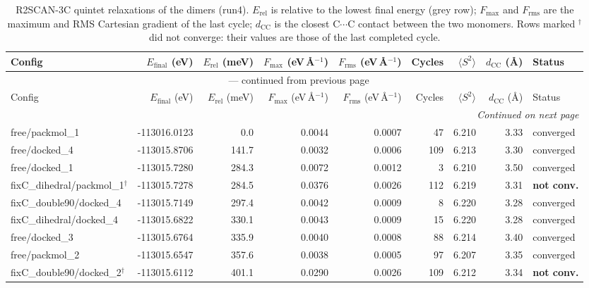 
\begin{longtable}{@{}lrrrrrrrl@{}}
\caption{R2SCAN-3C quintet relaxations of the dimers (run4). $E_{\mathrm{rel}}$ is relative to the
         lowest final energy (grey row); $F_{\mathrm{max}}$ and $F_{\mathrm{rms}}$ are the maximum and RMS
         Cartesian gradient of the last cycle; $d_{\mathrm{CC}}$ is the closest C$\cdots$C contact between the
         two monomers. Rows marked $^{\dagger}$ did not converge: their values are those of the last
         completed cycle.}\label{tab:run4_relaxation}\\
\toprule
Config & $E_{\mathrm{final}}$ (eV) & $E_{\mathrm{rel}}$ (meV) & $F_{\mathrm{max}}$ (eV\,\AA$^{-1}$) &
$F_{\mathrm{rms}}$ (eV\,\AA$^{-1}$) & Cycles & $\langle S^2\rangle$ & $d_{\mathrm{CC}}$ (\AA) & Status\\
\midrule
\endfirsthead
\multicolumn{9}{c}{{\tablename}~\thetable{} --- continued from previous page}\\
\toprule
Config & $E_{\mathrm{final}}$ (eV) & $E_{\mathrm{rel}}$ (meV) & $F_{\mathrm{max}}$ (eV\,\AA$^{-1}$) &
$F_{\mathrm{rms}}$ (eV\,\AA$^{-1}$) & Cycles & $\langle S^2\rangle$ & $d_{\mathrm{CC}}$ (\AA) & Status\\
\midrule
\endhead
\midrule
\multicolumn{9}{r}{\emph{Continued on next page}}\\
\endfoot
\bottomrule
\endlastfoot
\rowcolor{gray!20} free/packmol\_1 & -113016.0123 & 0.0 & 0.0044 & 0.0007 & 47 & 6.210 & 3.33 & converged \\
free/docked\_4 & -113015.8706 & 141.7 & 0.0032 & 0.0006 & 109 & 6.213 & 3.30 & converged \\
free/docked\_1 & -113015.7280 & 284.3 & 0.0072 & 0.0012 & 3 & 6.210 & 3.50 & converged \\
fixC\_dihedral/packmol\_1$^{\dagger}$ & -113015.7278 & 284.5 & 0.0376 & 0.0026 & 112 & 6.219 & 3.31 & \textbf{not conv.} \\
fixC\_double90/docked\_4 & -113015.7149 & 297.4 & 0.0042 & 0.0009 & 8 & 6.220 & 3.28 & converged \\
fixC\_dihedral/docked\_4 & -113015.6822 & 330.1 & 0.0043 & 0.0009 & 15 & 6.220 & 3.28 & converged \\
free/docked\_3 & -113015.6764 & 335.9 & 0.0040 & 0.0008 & 88 & 6.214 & 3.40 & converged \\
free/packmol\_2 & -113015.6547 & 357.6 & 0.0038 & 0.0005 & 97 & 6.207 & 3.35 & converged \\
fixC\_double90/docked\_2$^{\dagger}$ & -113015.6112 & 401.1 & 0.0290 & 0.0026 & 109 & 6.212 & 3.34 & \textbf{not conv.} \\

\end{longtable}
